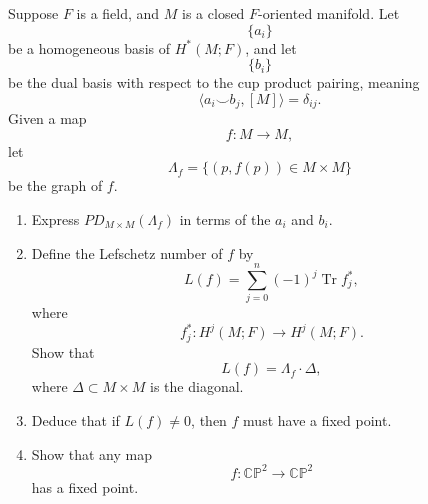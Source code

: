 \begin{problem}
Suppose \(F\) is a field, and \(M\) is a closed \(F\)-oriented manifold. Let
\[
\{a_i\}
\]
be a homogeneous basis of \(H^*(M;F)\), and let
\[
\{b_i\}
\]
be the dual basis with respect to the cup product pairing, meaning
\[
\langle a_i\smile b_j,[M]\rangle=\delta_{ij}.
\]
Given a map
\[
f:M\to M,
\]
let
\[
\Lambda_f=\{(p,f(p))\in M\times M\}
\]
be the graph of \(f\).

\begin{enumerate}
	\item[(a)] Express \(PD_{M\times M}(\Lambda_f)\) in terms of the \(a_i\) and \(b_i\).
	\item[(b)] Define the Lefschetz number of \(f\) by
	\[
	L(f)=\sum_{j=0}^{n}(-1)^j\operatorname{Tr} f_j^*,
	\]
	where
	\[
	f_j^*:H^j(M;F)\to H^j(M;F).
	\]
	Show that
	\[
	L(f)=\Lambda_f\cdot \Delta,
	\]
	where \(\Delta\subset M\times M\) is the diagonal.
	\item[(c)] Deduce that if \(L(f)\neq 0\), then \(f\) must have a fixed point.
	\item[(d)] Show that any map
	\[
	f:\mathbb{CP}^2\to \mathbb{CP}^2
	\]
	has a fixed point.
\end{enumerate}

\par

\noindent
\end{problem}

